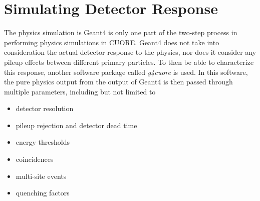 \section{Simulating Detector Response}
The physics simulation is Geant4 is only one part of the two-step process in performing physics simulations in CUORE.
Geant4 does not take into consideration the actual detector response to the physics, nor does it consider any pileup effects between different primary particles.
To then be able to characterize this response, another software package called \textit{g4cuore} is used.
In this software, the pure physics output from the output of Geant4 is then passed through multiple parameters, including but not limited to
\begin{itemize}
    \item detector resolution
    \item pileup rejection and detector dead time
    \item energy thresholds
    \item coincidences
    \item multi-site events
    \item quenching factors
\end{itemize}